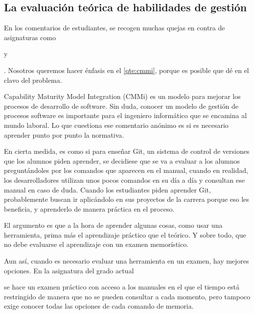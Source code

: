 

\subsection{La evaluación teórica de habilidades de gestión}


En los comentarios de estudiantes,
se recogen muchas quejas en contra de asignaturas como
\subject{Gestión de Proyectos de Desarrollo Software (GPDS)} y
\subject{Procesos de Desarrollo de Software (PDS)}.
Nosotros queremos hacer énfasis en el \cref{qte:cmmi},
porque es posible que dé en el clavo del problema.

Capability Maturity Model Integration (CMMi) es un modelo para mejorar
los procesos de desarrollo de software.
Sin duda, conocer un modelo de gestión de procesos software
es importante para el ingeniero informático que se encamina al mundo laboral.
Lo que cuestiona ese comentario anónimo es si
es necesario aprender punto por punto la normativa.

En cierta medida, es como si para enseñar Git,
un sistema de control de versiones que los alumnos piden aprender,
se decidiese que se va a evaluar a los alumnos preguntándoles
por los comandos que aparecen en el manual,
cuando en realidad, los desarrolladores utilizan
unos pocos comandos en su día a día y
consultan ese manual en caso de duda.
Cuando los estudiantes piden aprender Git,
probablemente buscan ir aplicándolo en sus proyectos de la carrera
porque eso les beneficia,
y aprenderlo de manera práctica en el proceso.

El argumento es que a la hora de aprender algunas cosas,
como usar una herramienta,
prima más el aprendizaje práctico que el teórico.
Y sobre todo, que no debe evaluarse el aprendizaje con un examen memorístico.

Aun así, cuando es necesario evaluar una herramienta en un examen,
hay mejores opciones.
En la asignatura del grado actual
\subject{Introducción a los Sistemas Operativos}
se hace un examen práctico con acceso a los manuales
en el que el tiempo está restringido de manera que
no se pueden consultar a cada momento,
pero tampoco exige conocer todas las opciones de cada comando de memoria.

